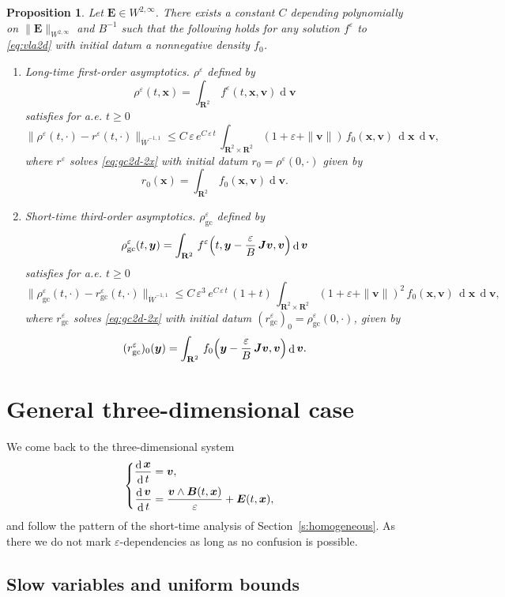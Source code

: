 \documentclass[JEP,XML,SOM,Unicode]{cedram}
\newenvironment{enumeratei}
{\bgroup\def\theenumi{\roman{enumi}}\def\theenumii{\arabic{enumii}}\begin{enumerate}}
{\end{enumerate}\egroup}
\newenvironment{splitcases}
{\begin{cases}\begin{aligned}}
{\end{aligned}\end{cases}}
\let\eps\varepsilon
\DeclareMathOperator\dD{d}\let\dd\dD
\theoremstyle{plain}
\newtheorem{proposition}[theorem]{Proposition}
\theoremstyle{definition}
\newcommand{\be}{\begin{equation}}
\newcommand{\ee}{\end{equation}}
\newcommand{\bpr}{\begin{proposition}}
\newcommand{\epr}{\end{proposition}}
\newcommand\R{\mathbf R}
\newcommand\bB{{\boldsymbol B}}
\newcommand\bE{{\boldsymbol E}}
\newcommand\bJ{{\boldsymbol J}}
\newcommand\bfv{{\boldsymbol v}}
\newcommand\bfx{{\boldsymbol x}}
\newcommand\bfy{{\boldsymbol y}}
\begin{document}
\bpr
Let $\bE\in W^{2,\infty}$. There exists a constant $C$ depending polynomially on $\|\bE\|_{W^{2,\infty}}$ and $B^{-1}$ such that the following holds for any solution $f^\eps$ to \eqref{eq:vla2d} with initial datum a nonnegative density $f_0$.
\begin{enumeratei}
\item
\emph{Long-time first-order asymptotics}. $\rho^\eps$ defined by
\[
\rho^\eps(t,\bfx)=\int_{\R^2}\,f^\eps(t,\bfx,\bfv)\dD \bfv
\]
satisfies for a.e. $t\geq0$
\[
\|\rho^\eps(t,\cdot)-r^\eps(t,\cdot)\|_{\dot{W}^{-1,1}}\leq C\,\eps\,e^{C\,\eps\,t}\,\int_{\R^2\times\R^2}(1+\eps+\|\bfv\|)\,f_0(\bfx,\bfv)\,\dD\bfx\,\dD\bfv,
\]
where $r^\eps$ solves \eqref{eq:gc2d-2x} with initial datum $r_0=\rho^\eps(0,\cdot)$ given by
\[
r_0(\bfx)=\int_{\R^2}\,f_0(\bfx,\bfv)\dD \bfv.
\]

\item
\emph{Short-time third-order asymptotics}. $\rho_\mathrm{gc}^\eps$ defined by
\[
\rho_\mathrm{gc}^\eps(t,\bfy)=\int_{\R^2}\,f^\eps\Bigl(t,\bfy-\frac{\eps}{B}\,\bJ\bfv,\bfv\Bigr)\dD\bfv
\]
satisfies for a.e. $t\geq0$
\[
\|\rho_\mathrm{gc}^\eps(t,\cdot)-r_\mathrm{gc}^\eps(t,\cdot)\|_{\dot{W}^{-1,1}}\leq C\,\eps^3\,e^{C\,\eps\,t}\,(1+t)\,\int_{\R^2\times\R^2}(1+\eps+\|\bfv\|)^2\,f_0(\bfx,\bfv)\,\dD\bfx\,\dD\bfv,
\]
where $r_\mathrm{gc}^\eps$ solves \eqref{eq:gc2d-2x} with initial datum $(r_\mathrm{gc}^\eps)_0=\rho_\mathrm{gc}^\eps(0,\cdot)$, given by
\[
(r_\mathrm{gc}^\eps)_0(\bfy)=\int_{\R^2}\,f_0\Bigl(\bfy-\frac{\eps}{B}\,\bJ\bfv,\bfv\Bigr)\dD\bfv.
\]
\end{enumeratei}
\epr

\section{General three-dimensional case}\label{s:general}

We come back to the three-dimensional system
\be
\label{e:xv}
\begin{splitcases}
\frac{\dD\bfx}{\dD t}&=\bfv,
\\
\frac{\dD\bfv}{\dD t}&=\frac{\bfv\wedge \bB(t,\bfx)}{\eps} +\bE(t,\bfx),
\end{splitcases}
\ee
and follow the pattern of the short-time analysis of Section~\ref{s:homogeneous}. As there we do not mark $\eps$-dependencies as long as no confusion is possible.

\subsection{Slow variables and uniform bounds}
\end{document}
